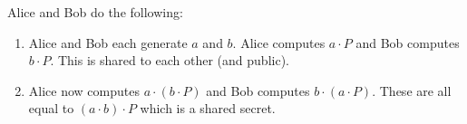 Alice and Bob do the following:

\begin{enumerate}
    \item Alice and Bob each generate $a$ and $b$. Alice computes $a\cdot P$ and Bob computes $b\cdot P$. This is shared to each other (and public).
    \item Alice now computes $a\cdot (b\cdot P)$ and Bob computes $b\cdot (a\cdot P)$. These are all equal to $(a\cdot b)\cdot P$ which is a shared secret.
\end{enumerate}
